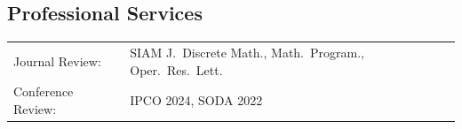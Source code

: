 \documentclass[margin,line]{res}
\newenvironment{list2}{
  \begin{list}{$\bullet$}{%
      \setlength{\itemsep}{0in}
      \setlength{\parsep}{0in} \setlength{\parskip}{0in}
      \setlength{\topsep}{0in} \setlength{\partopsep}{0in}
      \setlength{\leftmargin}{0.2in}}}{\end{list}}
\begin{document}
\begin{resume}
\section{\sc Professional Services}

\vspace{.05in}
\begin{tabular}{@{}p{1.18in}p{3.85in}}

Journal Review:& SIAM J.\ Discrete Math., Math.\ Program., Oper.\ Res.\ Lett.\\
Conference Review:& IPCO 2024, SODA 2022

\end{tabular}







\end{resume}
\end{document}
